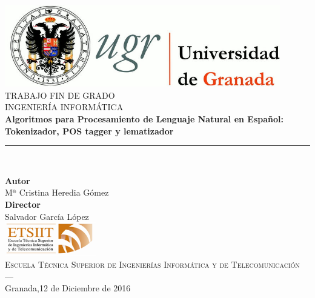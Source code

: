 \begin{titlepage}
 
\newlength{\centeroffset}
\setlength{\centeroffset}{-0.5\oddsidemargin}
\addtolength{\centeroffset}{0.5\evensidemargin}
\thispagestyle{empty}

\noindent\hspace*{\centeroffset}%

\centering
\includegraphics[width=0.9\textwidth]{imagenes/logo_ugr.jpg}\\[1.4cm]

\textsc{ \Large TRABAJO FIN DE GRADO\\[0.2cm]}
\textsc{ INGENIERÍA INFORMÁTICA}\\[1cm]
% 
{\huge\bfseries Algoritmos para Procesamiento de Lenguaje Natural en Español: Tokenizador, POS tagger y lematizador \\
}
\noindent\rule[-1ex]{\textwidth}{3pt}\\[3.5ex]

\vspace{1.0cm}
\noindent\hspace*{\centeroffset}%
\centering

\textbf{Autor}\\ {Mª Cristina Heredia Gómez}\\[2.5ex]
\textbf{Director}\\
{Salvador García López}\\[2cm]
\includegraphics[width=0.3\textwidth]{imagenes/etsiit_logo.png}\\[0.1cm]
\textsc{Escuela Técnica Superior de Ingenierías Informática y de Telecomunicación}\\
\textsc{---}\\
Granada,12 de Diciembre de 2016
\end{titlepage}




